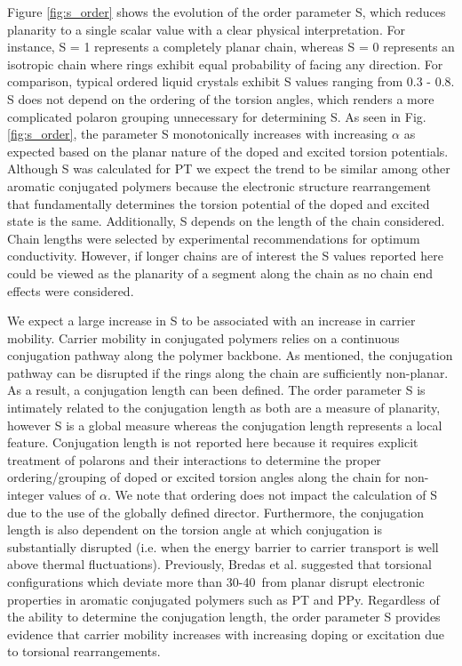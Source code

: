 Figure \ref{fig:s_order} shows the evolution of the order parameter S, which reduces planarity to a single scalar value with a clear physical interpretation. For instance, S = 1 represents a completely planar chain, whereas S = 0 represents an isotropic chain where rings exhibit equal probability of facing any direction. For comparison, typical ordered liquid crystals exhibit S values ranging from 0.3 - 0.8.\cite{Colfen2008} S does not depend on the ordering of the torsion angles, which renders a more complicated polaron grouping unnecessary for determining S. As seen in Fig. \ref{fig:s_order}, the parameter S monotonically increases with increasing $\alpha$ as expected based on the planar nature of the doped and excited torsion potentials. Although S was calculated for PT we expect the trend to be similar among other aromatic conjugated polymers because the electronic structure rearrangement that fundamentally determines the torsion potential of the doped and excited state is the same. Additionally, S depends on the length of the chain considered. Chain lengths were selected by experimental recommendations for optimum conductivity.\cite{Noriega2013} However, if longer chains are of interest the S values reported here could be viewed as the planarity of a segment along the chain as no chain end effects were considered.

We expect a large increase in S to be associated with an increase in carrier mobility. Carrier mobility in conjugated polymers relies on a continuous conjugation pathway along the polymer backbone.\cite{Shin2010} As mentioned, the conjugation pathway can be disrupted if the rings along the chain are sufficiently non-planar. As a result, a conjugation length can been defined. The order parameter S is intimately related to the conjugation length as both are a measure of planarity, however S is a global measure whereas the conjugation length represents a local feature. Conjugation length is not reported here because it requires explicit treatment of polarons and their interactions to determine the proper ordering/grouping of doped or excited torsion angles along the chain for non-integer values of $\alpha$. We note that ordering does not impact the calculation of S due to the use of the globally defined director. Furthermore, the conjugation length is also dependent on the torsion angle at which conjugation is substantially disrupted (i.e. when the energy barrier to carrier transport is well above thermal fluctuations). Previously, Bredas et al. suggested that torsional configurations which deviate more than 30-40\textdegree \ from planar disrupt electronic properties in aromatic conjugated polymers such as PT and PPy.\cite{Bredas1985} Regardless of the ability to determine the conjugation length, the order parameter S provides evidence that carrier mobility increases with increasing doping or excitation due to torsional rearrangements.

